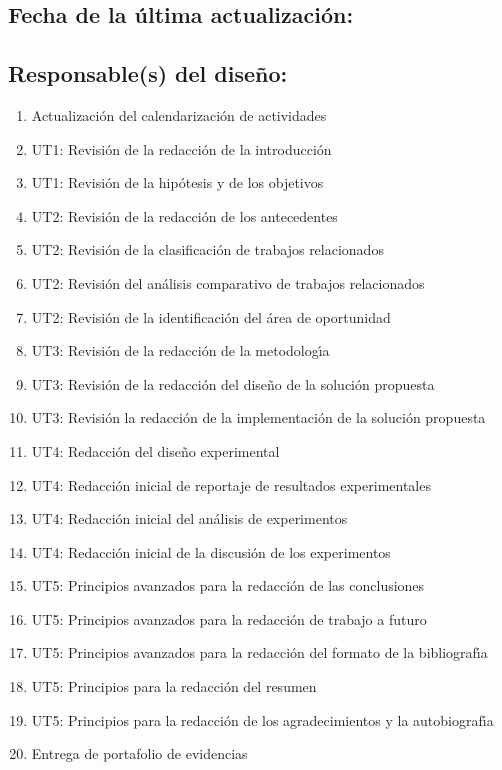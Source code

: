 \documentclass[10 pt]{article}
\begin{document}
\subsection{Fecha de la \'{u}ltima actualizaci\'{o}n:} 
\subsection{Responsable(s) del dise\~{n}o:}
\fbox{\parbox{9cm}{\begin{itemize}[label={}]
\item {\nroger~\roger}
\item {\nelisa~\elisa}
\end{itemize}}}
\newpage



\begin{enumerate}[itemsep=-2pt]
\item Actualizaci\'{o}n del calendarizaci\'{o}n de actividades
\item UT1: Revisi\'{o}n de la redacci\'{o}n de la introducci\'{o}n
\item UT1: Revisi\'{o}n de la hip\'{o}tesis y de los objetivos
\item UT2: Revisi\'{o}n de la redacci\'{o}n de los antecedentes
\item UT2: Revisi\'{o}n de la clasificaci\'{o}n de trabajos relacionados
\item UT2: Revisi\'{o}n del an\'{a}lisis comparativo de trabajos relacionados
\item UT2: Revisi\'{o}n de la identificaci\'{o}n del \'{a}rea de oportunidad
\item UT3: Revisi\'{o}n de la redacci\'{o}n de la metodolog\'{\i}a
\item UT3: Revisi\'{o}n de la redacci\'{o}n del dise\~{n}o de la soluci\'{o}n propuesta
\item UT3: Revisi\'{o}n la redacci\'{o}n de la implementaci\'{o}n de la soluci\'{o}n propuesta
\item UT4: Redacci\'{o}n del dise\~{n}o experimental
\item UT4: Redacci\'{o}n inicial de reportaje de resultados experimentales
\item UT4: Redacci\'{o}n inicial del an\'{a}lisis de experimentos
\item UT4: Redacci\'{o}n inicial de la discusi\'{o}n de los experimentos
\item UT5: Principios avanzados para la redacci\'{o}n de las conclusiones
\item UT5: Principios avanzados para la redacci\'{o}n de trabajo a futuro
\item UT5: Principios avanzados para la redacci\'{o}n del formato de la bibliograf\'{\i}a
\item UT5: Principios para la redacci\'{o}n del resumen
\item UT5: Principios para la redacci\'{o}n de los agradecimientos y la autobiograf\'{\i}a
\item Entrega de portafolio de evidencias
\end{enumerate}
\end{document}
